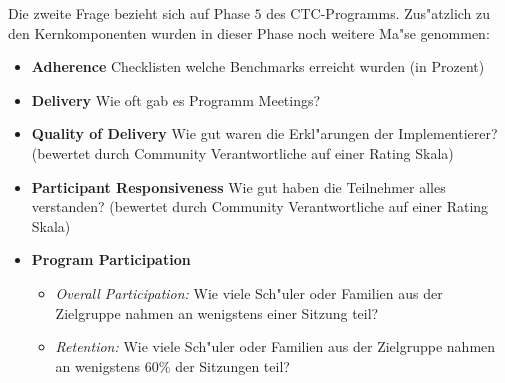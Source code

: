 Die zweite Frage bezieht sich auf Phase $5$ des CTC-Programms. Zus"atzlich zu den Kernkomponenten wurden in dieser Phase noch weitere Ma"se genommen:
\begin{itemize}
        \item \textbf{Adherence} Checklisten welche Benchmarks erreicht wurden (in Prozent)
        \item \textbf{Delivery} Wie oft gab es Programm Meetings?
        \item \textbf{Quality of Delivery} Wie gut waren die Erkl"arungen der Implementierer? (bewertet durch Community Verantwortliche auf einer Rating Skala)
        \item \textbf{Participant Responsiveness} Wie gut haben die Teilnehmer alles verstanden? (bewertet durch Community Verantwortliche auf einer Rating Skala)
        \item \textbf{Program Participation}
                \begin{itemize}
                        \item \emph{Overall Participation:} Wie viele Sch"uler oder Familien aus der Zielgruppe nahmen an wenigstens einer Sitzung teil?
                        \item \emph{Retention:} Wie viele Sch"uler oder Familien aus der Zielgruppe nahmen an wenigstens $60 \%$ der Sitzungen teil?
                \end{itemize}
\end{itemize}

